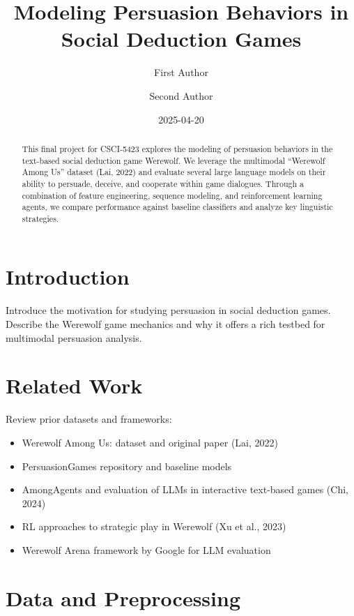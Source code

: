 \documentclass[
  letterpaper,
  DIV=11,
  numbers=noendperiod]{scrreprt}
\title{Modeling Persuasion Behaviors in Social Deduction Games}
\author{First Author \and Second Author}
\date{2025-04-20}
\providecommand{\tightlist}{%
  \setlength{\itemsep}{0pt}\setlength{\parskip}{0pt}}\usepackage{longtable,booktabs,array}
\renewcommand*\contentsname{Table of contents}
\newcommand\contentsname{Table of contents}
\begin{document}
\maketitle
\begin{abstract}
This final project for CSCI‑5423 explores the modeling of persuasion
behaviors in the text-based social deduction game Werewolf. We leverage
the multimodal ``Werewolf Among Us'' dataset (Lai, 2022) and evaluate
several large language models on their ability to persuade, deceive, and
cooperate within game dialogues. Through a combination of feature
engineering, sequence modeling, and reinforcement learning agents, we
compare performance against baseline classifiers and analyze key
linguistic strategies.
\end{abstract}

\renewcommand*\contentsname{Table of contents}
{
\hypersetup{linkcolor=}
\setcounter{tocdepth}{2}
\tableofcontents
}

\chapter{Introduction}\label{introduction}

Introduce the motivation for studying persuasion in social deduction
games. Describe the Werewolf game mechanics and why it offers a rich
testbed for multimodal persuasion analysis.

\chapter{Related Work}\label{related-work}

Review prior datasets and frameworks:

\begin{itemize}
\tightlist
\item
  Werewolf Among Us: dataset and original paper (Lai, 2022)
\item
  PersuasionGames repository and baseline models
\item
  AmongAgents and evaluation of LLMs in interactive text-based games
  (Chi, 2024)
\item
  RL approaches to strategic play in Werewolf (Xu et al., 2023)
\item
  Werewolf Arena framework by Google for LLM evaluation
\end{itemize}

\chapter{Data and Preprocessing}\label{data-and-preprocessing}
\end{document}
